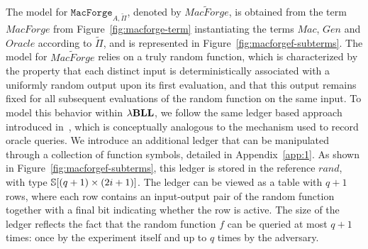 The model for $\mathtt{MacForge}_{A,\widetilde{\Pi}}$, denoted by $\widetilde{\mathit{MacForge}}$, is obtained from the term $\mathit{MacForge}$ from Figure~\ref{fig:macforge-term} instantiating the terms $Mac$, $Gen$ and $Oracle$ according to $\widetilde{\Pi}$, and is represented in Figure~\ref{fig:macforgef-subterms}. The model for $\widetilde{MacForge}$ relies on a truly random function, which is characterized by the property that each distinct input is deterministically associated with a uniformly random output upon its first evaluation, and that this output remains fixed for all subsequent evaluations of the random function on the same input. To model this behavior within ${\lambda}\mathbf{BLL}$, we follow the same ledger based approach introduced in~\cite{lago2024-extended}, which is conceptually analogous to the mechanism used to record oracle queries. We introduce an additional ledger that can be manipulated through a collection of function symbols, detailed in Appendix~\ref{app:1}. As shown in Figure~\ref{fig:macforgef-subterms}, this ledger is stored in the reference $rand$, with type $\mathbb{S}[(q+1)\times(2i+1)]$. The ledger can be viewed as a table with $q+1$ rows, where each row contains an input-output pair of the random function together with a final bit indicating whether the row is active. The size of the ledger reflects the fact that the random function $f$ can be queried at most $q+1$ times: once by the experiment itself and up to $q$ times by the adversary.

